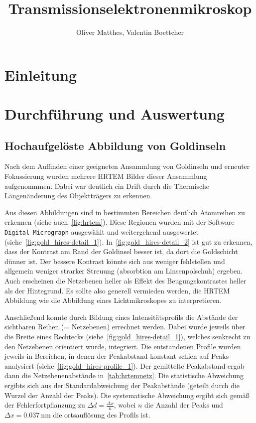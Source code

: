 \documentclass[slug=TEM, room=IFW, supervisor=?, coursedate=23.\ 01.\ 2020]{../../Lab_Report_LaTeX/lab_report}
\title{Transmissionselektronenmikroskop}
\author{Oliver Matthes, Valentin Boettcher}
\begin{document}
\maketitle

\section{Einleitung}
\label{sec:einl}

\section{Durchf\"uhrung und Auswertung}
\label{sec:durchaus}

\subsection{Hochaufgel\"oste Abbildung von Goldinseln}
\label{sec:hrtem}

Nach dem Auffinden einer geeigneten Ansammlung von Goldinseln und erneuter
Fokussierung wurden mehrere HRTEM Bilder dieser Ansammlung
aufgenonmmen. Dabei war deutlich ein Drift durch die Thermische
L\"angen\"anderung des Objekttr\"agers zu erkennen.

Aus diesen Abbildungen sind in bestimmten Bereichen deutlich
Atomreihen zu erkennen (siehe auch~\ref{fig:hrtem}). Diese Regionen
wurden mit der Software \verb|Digital Micrograph| ausgew\"ahlt und
weitergehend ausgewertet
(siehe~\ref{fig:gold_hires-detail_1}). In~\ref{fig:gold_hires-detail_2}
ist gut zu erkennen, dass der Kontrast am Rand der Goldinsel besser
ist, da dort die Goldschicht d\"unner ist. Der bessere Kontrast
k\"onnte sich aus weniger fehlstellen und allgemein weniger strarker
Streuung (absorbtion am Linsenpolschuh) ergeben. Auch erscheinen die
Netzebenen heller als Effekt des Beugungskontrastes heller als der
Hintegrund. Es sollte also generell vermieden werden, die HRTEM
Abbildung wie die Abbildung eines Lichtmikroskopes zu interpretieren.


Anschließend konnte durch Bildung eines Intensitätsprofils die
Abst\"ande der sichtbaren Reihen (= Netzebenen) errechnet
werden. Dabei wurde jeweils \"uber die Breite eines Rechtecks
(siehe~\ref{fig:gold_hires-detail_1}), welches senkrecht zu den
Netzebenen orientiert wurde, integriert. Die entstandenen Profile
wurden jeweils in Bereichen, in denen der Peakabstand konstant schien
auf Peaks analysiert (siehe~\ref{fig:gold_hires-profile_1}). Der
gemittelte Peakabstand ergab dann die Netzebenenabst\"ande
in~\ref{tab:hrtemnetz}. Die statistische Abweichung ergibts sich aus
der Standardabweichung der Peakabst\"ande (geteilt durch die Wurzel
der Anzahl der Peaks). Die systematische Abweichung ergibt sich
gem\"a\ss{} der Fehlerfortpflanzung zu
\(\Delta d = \frac{\Delta x}{n}\), wobei \(n\) die Anzahl der Peaks
und \(\Delta x = \SI{0.037}{\nano\meter}\) die ortsaufl\"osung des
Profils ist.
\end{document}
